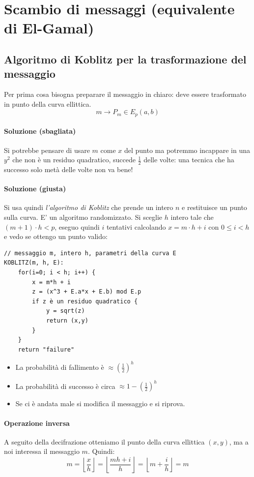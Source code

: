 \section{Scambio di messaggi (equivalente di El-Gamal)}
\subsection{Algoritmo di Koblitz per la trasformazione del messaggio}
Per prima cosa bisogna preparare il messaggio in chiaro: deve essere trasformato in punto della curva ellittica. 
$$ m \xrightarrow{} P_m \in E_p(a,b) $$
\paragraph{Soluzione (sbagliata)}Si potrebbe pensare di usare $m$ come $x$ del punto ma potremmo incappare in una $y^2$ che non è un residuo quadratico, succede $\frac{1}{2}$ delle volte: una tecnica che ha successo solo metà delle volte non va bene!
\paragraph{Soluzione (giusta)} Si usa quindi \emph{l'algoritmo di Koblitz} che prende un intero $n$ e restituisce un punto sulla curva.
E' un algoritmo randomizzato. Si sceglie $h$ intero tale che $(m + 1) \cdot h < p$, eseguo quindi $i$ tentativi calcolando $x = m \cdot h + i$ con $0 \leq i < h$ e vedo se ottengo un punto valido:

\begin{verbatim}
// messaggio m, intero h, parametri della curva E
KOBLITZ(m, h, E):
    for(i=0; i < h; i++) {
        x = m*h + i
        z = (x^3 + E.a*x + E.b) mod E.p
        if z è un residuo quadratico {
            y = sqrt(z)
            return (x,y)
        }    
    }
    return "failure"
\end{verbatim}
\begin{itemize}
	\item La probabilità di fallimento è $\approx \left(\frac{1}{2}\right)^h$
	\item La probabilità di successo è circa $\approx 1 - \left(\frac{1}{2}\right)^h$
	\item Se ci è andata male si modifica il messaggio e si riprova.
\end{itemize}

\paragraph{Operazione inversa} A seguito della decifrazione otteniamo il punto della curva ellittica $(x,y)$, ma a noi interessa il messaggio $m$. Quindi:
$$ m = \left\lfloor \frac{x}{h} \right\rfloor = \left\lfloor \frac{mh+i}{h} \right\rfloor = \left\lfloor m + \frac{i}{h} \right\rfloor = m $$

